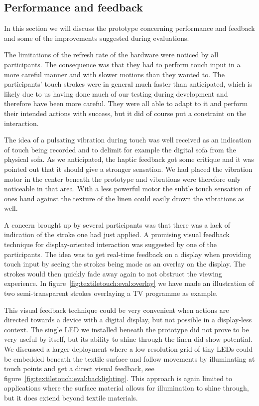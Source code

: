 \subsection{Performance and feedback}

In this section we will discuss the prototype concerning performance and feedback and some of the improvements suggested during evaluations.

The limitations of the refresh rate of the hardware were noticed by all participants.
The consequence was that they had to perform touch input in a more careful manner and with slower motions than they wanted to.
The participants' touch strokes were in general much faster than anticipated, which is likely due to us having done much of our testing during development and therefore have been more careful.
They were all able to adapt to it and perform their intended actions with success, but it did of course put a constraint on the interaction.

The idea of a pulsating vibration during touch was well received as an indication of touch being recorded and to delimit for example the digital sofa from the physical sofa. 
As we anticipated, the haptic feedback got some critique and it was pointed out that it should give a stronger sensation.
We had placed the vibration motor in the center beneath the prototype and vibrations were therefore only noticeable in that area.
With a less powerful motor the subtle touch sensation of ones hand against the texture of the linen could easily drown the vibrations as well.

A concern brought up by several participants was that there was a lack of indication of the stroke one had just applied.
A promising visual feedback technique for display-oriented interaction was suggested by one of the participants.
The idea was to get real-time feedback on a display when providing touch input by seeing the strokes being made as an overlay on the display.
The strokes would then quickly fade away again to not obstruct the viewing experience. 
In figure~\ref{fig:textiletouch:eval:overlay} we have made an illustration of two semi-transparent strokes overlaying a TV programme as example. 

This visual feedback technique could be very convenient when actions are directed towards a device with a digital display, but not possible in a display-less context.
The single LED we installed beneath the prototype did not prove to be very useful by itself, but its ability to shine through the linen did show potential.
We discussed a larger deployment where a low resolution grid of tiny LEDs could be embedded beneath the textile surface and follow movements by illuminating at touch points and get a direct visual feedback, see figure~\ref{fig:textiletouch:eval:backlighting}.
This approach is again limited to applications where the surface material allows for illumination to shine through, but it does extend beyond textile materials.

